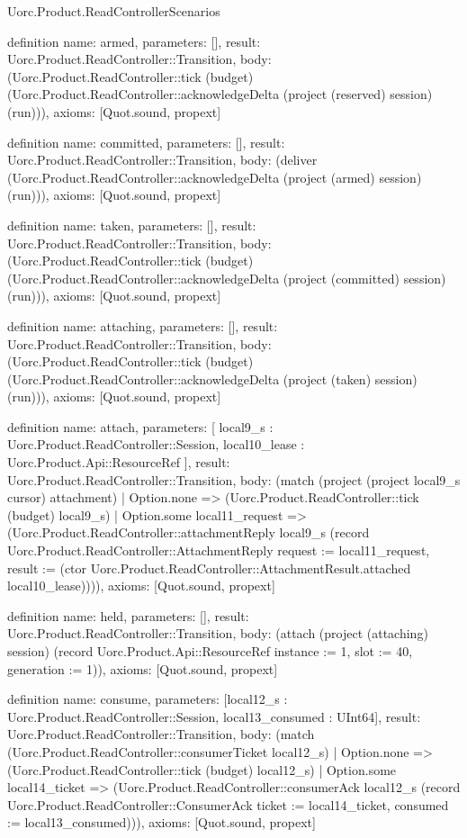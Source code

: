 \begin{lexlean}{Uorc.Product.ReadControllerScenarios}
\begin{semanticmodule}
definition{
  name: armed,
  parameters: [],
  result: Uorc.Product.ReadController::Transition,
  body: (Uorc.Product.ReadController::tick (budget) (Uorc.Product.ReadController::acknowledgeDelta (project (reserved) session) (run))),
  axioms: [Quot.sound, propext]
}

definition{
  name: committed,
  parameters: [],
  result: Uorc.Product.ReadController::Transition,
  body: (deliver (Uorc.Product.ReadController::acknowledgeDelta (project (armed) session) (run))),
  axioms: [Quot.sound, propext]
}

definition{
  name: taken,
  parameters: [],
  result: Uorc.Product.ReadController::Transition,
  body: (Uorc.Product.ReadController::tick (budget) (Uorc.Product.ReadController::acknowledgeDelta (project (committed) session) (run))),
  axioms: [Quot.sound, propext]
}

definition{
  name: attaching,
  parameters: [],
  result: Uorc.Product.ReadController::Transition,
  body: (Uorc.Product.ReadController::tick (budget) (Uorc.Product.ReadController::acknowledgeDelta (project (taken) session) (run))),
  axioms: [Quot.sound, propext]
}

definition{
  name: attach,
  parameters: [
    local9_s : Uorc.Product.ReadController::Session,
    local10_lease : Uorc.Product.Api::ResourceRef
  ],
  result: Uorc.Product.ReadController::Transition,
  body: (match (project (project local9_s cursor) attachment)
    | Option.none => (Uorc.Product.ReadController::tick (budget) local9_s)
    | Option.some local11_request => (Uorc.Product.ReadController::attachmentReply local9_s (record Uorc.Product.ReadController::AttachmentReply {request := local11_request, result := (ctor Uorc.Product.ReadController::AttachmentResult.attached local10_lease)}))),
  axioms: [Quot.sound, propext]
}

definition{
  name: held,
  parameters: [],
  result: Uorc.Product.ReadController::Transition,
  body: (attach (project (attaching) session) (record Uorc.Product.Api::ResourceRef {instance := 1, slot := 40, generation := 1})),
  axioms: [Quot.sound, propext]
}

definition{
  name: consume,
  parameters: [local12_s : Uorc.Product.ReadController::Session, local13_consumed : UInt64],
  result: Uorc.Product.ReadController::Transition,
  body: (match (Uorc.Product.ReadController::consumerTicket local12_s)
    | Option.none => (Uorc.Product.ReadController::tick (budget) local12_s)
    | Option.some local14_ticket => (Uorc.Product.ReadController::consumerAck local12_s (record Uorc.Product.ReadController::ConsumerAck {ticket := local14_ticket, consumed := local13_consumed}))),
  axioms: [Quot.sound, propext]
}


\end{semanticmodule}
\end{lexlean}
